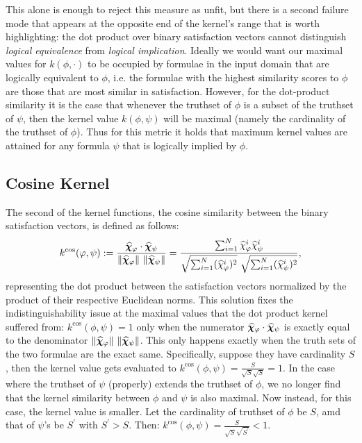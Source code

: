 \documentclass[titlepage,a4paper,11pt]{report}
\begin{document}
    This alone is enough to reject this measure as unfit, but there is a second failure mode that appears at the opposite end of the kernel's range that is worth highlighting: the dot product over binary satisfaction vectors cannot distinguish \emph{logical equivalence} from \emph{logical implication}. Ideally we would want our maximal values for $k(\phi,\cdot)$ to be occupied by formulae in the input domain that are logically equivalent to $\phi$, i.e. the formulae with the highest similarity scores to $\phi$ are those that are most similar in satisfaction. However, for the dot-product similarity it is the case that whenever the truthset of $\phi$ is a subset of the truthset of $\psi$, then the kernel value $k(\phi, \psi)$ will be maximal (namely the cardinality of the truthset of $\phi$). Thus for this metric it holds that maximum kernel values are attained for any formula $\psi$ that is logically implied by $\phi$.

    \subsection{Cosine Kernel}\label{eq:cosine_kernel}
    The second of the kernel functions, the cosine similarity between the binary satisfaction vectors, is defined as follows:
    \begin{equation}
        k^{\cos}(\varphi,\psi):= \frac{\bm{\widehat\chi}_\varphi \cdot \bm{\widehat\chi}_\psi}{\Vert \bm{\widehat\chi}_\varphi \Vert \mkern6mu \Vert \bm{\widehat\chi}_\psi \Vert} = \frac{\sum^N_{i=1} \widehat \chi^i_{\varphi} \widehat \chi^i_{\psi}}{\sqrt{\sum^N_{i=1} (\widehat \chi^i_{\varphi})^2} \mkern6mu \sqrt{\sum^N_{i=1} (\widehat \chi^i_{\psi})^2}},
    \end{equation}
    representing the dot product between the satisfaction vectors normalized by the product of their respective Euclidean norms. This solution fixes the indistinguishability issue at the maximal values that the dot product kernel suffered from: $k^{\cos}(\phi,\psi) = 1$ only when the numerator $\bm{\widehat\chi}_\varphi \cdot \bm{\widehat\chi}_\psi$ is exactly equal to the denominator $\Vert \bm{\widehat\chi}_\varphi \Vert \mkern6mu \Vert \bm{\widehat\chi}_\psi \Vert$. This only happens exactly when the truth sets of the two formulae are the exact same. Specifically, suppose they have cardinality $S$, then the kernel value gets evaluated to $k^{\cos}(\phi,\psi) = \frac{S}{\sqrt{S} \sqrt{S}} = 1$. In the case where the truthset of $\psi$ (properly) extends the truthset of $\phi$, we no longer find that the kernel similarity between $\phi$ and $\psi$ is also maximal. Now instead, for this case, the kernel value is smaller. Let the cardinality of truthset of $\phi$ be $S$, amd that of $\psi$'s be $S^\prime$ with $S^\prime > S$. Then: $k^{\cos}(\phi,\psi) = \frac{S}{\sqrt{S} \sqrt{S^\prime}} < 1$. 
\end{document}
